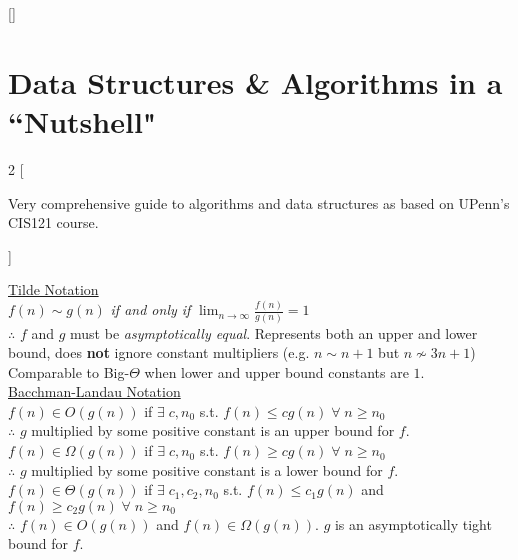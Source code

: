 \documentclass[12pt, fleqn]{general}
\begin{document}
\titleformat{\section}{\normalfont\LARGE\bfseries\centering}{\thesection}{1em}{}[{\titlerule[0.6pt]}]

\section*{Data Structures \& Algorithms in a ``Nutshell"}
\vspace{-20pt}

    \fontsize{10pt}{12pt}
\begin{multicols*}{2}
[{\small \begin{center}Very comprehensive guide to algorithms and data structures as based on UPenn's CIS121 course.\end{center}}]

    {\large \underline{Tilde Notation}}\\

    $f(n) \sim g(n)$ \emph{if and only if} $\lim_{n\rightarrow\infty} \frac{f(n)}{g(n)} = 1$\\ 

    $\therefore$ $f$ and $g$ must be \emph{asymptotically equal}. Represents both an upper and lower bound, does \textbf{not} ignore constant multipliers (e.g. $n \sim n + 1$ but $n \not\sim 3n + 1$) Comparable to Big-$\Theta$ when lower and upper bound constants are $1$.\\

    {\large \underline{Bacchman-Landau Notation}}\\

    $f(n) \in O(g(n))$ if $\exists\; c,n_0$ s.t. $f(n) \leq c g(n)\; \forall\; n \geq n_0$\\
    $\therefore$ $g$ multiplied by some positive constant is an upper bound for $f$.\\

    $f(n) \in \Omega(g(n))$ if $\exists\; c,n_0$ s.t. $f(n) \geq c g(n)\;\forall\; n \geq n_0$\\
    $\therefore$ $g$ multiplied by some positive constant is a lower bound for $f$.\\

    $f(n) \in \Theta(g(n))$ if $\exists\; c_1, c_2, n_0$ s.t. $f(n) \leq c_1 g(n)$ and $f(n) \geq c_2 g(n)\;\forall\; n \geq n_0$\\
    $\therefore$ $f(n) \in O(g(n))$ and $f(n) \in \Omega(g(n))$. $g$ is an asymptotically tight bound for $f$.\\


\end{multicols*}
\end{document}
